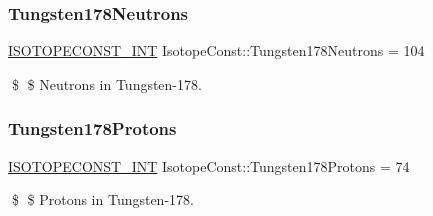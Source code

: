 \subsubsection{\texorpdfstring{Tungsten178\+Neutrons}{Tungsten178Neutrons}}
{\footnotesize\ttfamily \mbox{\hyperlink{group___isotope_const-_macros_ga5f18360b3e99483a35c32d789e62621c}{I\+S\+O\+T\+O\+P\+E\+C\+O\+N\+S\+T\+\_\+\+I\+NT}} Isotope\+Const\+::\+Tungsten178\+Neutrons = 104}

\$ \$ Neutrons in Tungsten-\/178. \mbox{\label{group___isotope_const-_tungsten-_w178_ga1f03f9db61389e50bf69f8da8ae982c8}} 
\subsubsection{\texorpdfstring{Tungsten178\+Protons}{Tungsten178Protons}}
{\footnotesize\ttfamily \mbox{\hyperlink{group___isotope_const-_macros_ga5f18360b3e99483a35c32d789e62621c}{I\+S\+O\+T\+O\+P\+E\+C\+O\+N\+S\+T\+\_\+\+I\+NT}} Isotope\+Const\+::\+Tungsten178\+Protons = 74}

\$ \$ Protons in Tungsten-\/178. 